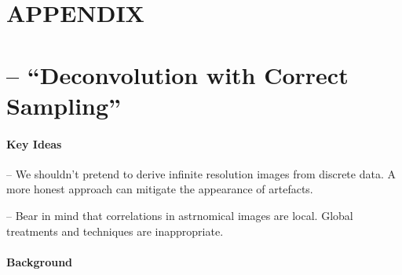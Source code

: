 \documentclass[letterpaper, 11pt]{article}
\def\ra{\ensuremath{\rightarrow}\xspace}
\begin{document}

\newpage
\appendix
{}
\section*{APPENDIX}

\section{\citet{MCS98} -- ``Deconvolution with Correct Sampling''}
\label{sec:MCS98notes}

\paragraph{Key Ideas}

-- We shouldn't pretend to derive infinite resolution images from discrete data. A more honest approach can mitigate the appearance of 
artefacts.

-- Bear in mind that correlations in astrnomical images are local. Global treatments and techniques are inappropriate.


\paragraph{Background}
\end{document}
